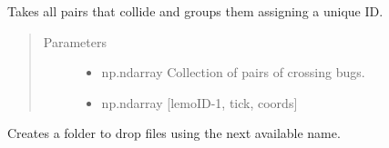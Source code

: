 \documentclass[letterpaper,10pt,english]{sphinxmanual}
\begin{document}
\begin{fulllineitems}
\label{\detokenize{reference:taipanPyRouter.consolidateCGroups}}
Takes all pairs that collide and groups them assigning a unique ID.
\begin{quote}\begin{description}
\item[{Parameters}] \leavevmode\begin{itemize}
\item {} 
 \textendash{} np.ndarray Collection of pairs of crossing bugs.

\item {} 
 \textendash{} np.ndarray {[}lemoID-1, tick, coords{]}

\end{itemize}

\end{description}\end{quote}

\end{fulllineitems}


\begin{fulllineitems}
\label{\detokenize{reference:taipanPyRouter.createWorkingFolder}}
Creates a folder to drop files using the next available name.

\end{fulllineitems}


\begin{fulllineitems}
\label{\detokenize{reference:taipanPyRouter.doRoutes}}
\end{fulllineitems}

\end{document}
